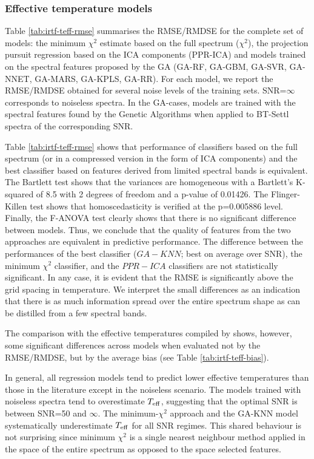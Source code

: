 
\subsubsection{Effective temperature models}
\label{sect:irtf-teff}

Table \ref{tab:irtf-teff-rmse} summarises the RMSE/RMDSE for the
complete set of models: the minimum $\chi^2$ estimate based on the
full spectrum ($\chi^2$), the projection pursuit regression based on
the ICA components (PPR-ICA) and models trained on the spectral
features proposed by the GA (GA-RF, GA-GBM, GA-SVR, GA-NNET, GA-MARS,
GA-KPLS, GA-RR). For each model, we report the RMSE/RMDSE obtained for
several noise levels of the training sets.  SNR=$\infty$ corresponds
to noiseless spectra. In the GA-cases, models are trained with the
spectral features found by the Genetic Algorithms when applied to
BT-Settl spectra of the corresponding SNR.

Table \ref{tab:irtf-teff-rmse} shows that performance of classifiers
based on the full spectrum (or in a compressed version in the form of
ICA components) and the best classifier based on features derived from
limited spectral bands is equivalent. The Bartlett test shows that the
variances are homogeneous with a Bartlett\textquoteright s K-squared
of 8.5 with 2 degrees of freedom and a p-value of 0.01426. The
Flinger-Killen test shows that homoscedasticity is verified at the
p=0.005886 level. Finally, the F-ANOVA test clearly shows that there
is no significant difference between models. Thus, we conclude that
the quality of features from the two approaches are equivalent in
predictive performance.  The difference between the performances of
the best classifier ($GA-KNN$; best on average over SNR), the minimum
$\chi^2$ classifier, and the $PPR-ICA$ classifiers are not
statistically significant. 
In any case, it is evident that the RMSE is significantly above the grid
spacing in temperature. We interpret the small differences as an
indication that there is as much information spread over the entire
spectrum shape as can be distilled from a few spectral bands.

The comparison with the effective temperatures compiled by
\cite{cesetti} shows, however, some significant differences across
models when evaluated not by the RMSE/RMDSE, but by the average bias
(see Table \ref{tab:irtf-teff-bias}). 

In general, all regression models tend to predict lower effective
temperatures than those in the literature except in the noiseless
scenario. The models trained with noiseless spectra tend to
overestimate $T_{\rm eff}$, suggesting that the optimal SNR is between
SNR=50 and $\infty$. The minimum-$\chi^2$ approach and the GA-KNN
model systematically underestimate $T_{\rm eff}$ for all SNR
regimes. This shared behaviour is not surprising since minimum
$\chi^2$ is a single nearest neighbour method applied in the space of
the entire spectrum as opposed to the space selected features.

